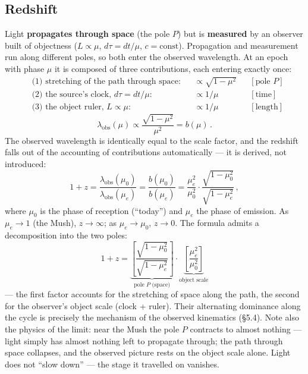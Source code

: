 \documentclass{article}
\begin{document}
\subsection{Redshift}

Light \textbf{propagates through space} (the pole $P$) but is \textbf{measured} by an observer built of objectness ($L \propto \mu$, $d\tau = dt/\mu$, $c = \text{const}$). Propagation and measurement run along different poles, so both enter the observed wavelength. At an epoch with phase $\mu$ it is composed of three contributions, each entering exactly once:
\begin{align*}
&\text{(1) stretching of the path through space:} && \propto \sqrt{1 - \mu^2} && [\text{pole } P] \\
&\text{(2) the source's clock, } d\tau = dt/\mu: && \propto 1/\mu && [\text{time}] \\
&\text{(3) the object ruler, } L \propto \mu: && \propto 1/\mu && [\text{length}]
\end{align*}
\begin{equation}
\lambda_{\text{obs}}(\mu) \propto \frac{\sqrt{1 - \mu^2}}{\mu^2} = b(\mu)\,.
\end{equation}
The observed wavelength is identically equal to the scale factor, and the redshift falls out of the accounting of contributions automatically --- it is derived, not introduced:
\begin{equation}
1 + z = \frac{\lambda_{\text{obs}}(\mu_0)}{\lambda_{\text{obs}}(\mu_e)} = \frac{b(\mu_0)}{b(\mu_e)} = \frac{\mu_e^2}{\mu_0^2} \cdot \frac{\sqrt{1 - \mu_0^2}}{\sqrt{1 - \mu_e^2}}\,,
\end{equation}
where $\mu_0$ is the phase of reception (``today'') and $\mu_e$ the phase of emission. As $\mu_e \to 1$ (the Mush), $z \to \infty$; as $\mu_e \to \mu_0$, $z \to 0$. The formula admits a decomposition into the two poles:
\begin{equation}
1 + z = \underbrace{\left[ \frac{\sqrt{1 - \mu_0^2}}{\sqrt{1 - \mu_e^2}} \right]}_{\text{pole } P\text{ (space)}} \cdot \underbrace{\left[ \frac{\mu_e^2}{\mu_0^2} \right]}_{\text{object scale}}
\end{equation}
--- the first factor accounts for the stretching of space along the path, the second for the observer's object scale (clock + ruler). Their alternating dominance along the cycle is precisely the mechanism of the observed kinematics (\S5.4). Note also the physics of the limit: near the Mush the pole $P$ contracts to almost nothing --- light simply has almost nothing left to propagate through; the path through space collapses, and the observed picture rests on the object scale alone. Light does not ``slow down'' --- the stage it travelled on vanishes.
\end{document}
